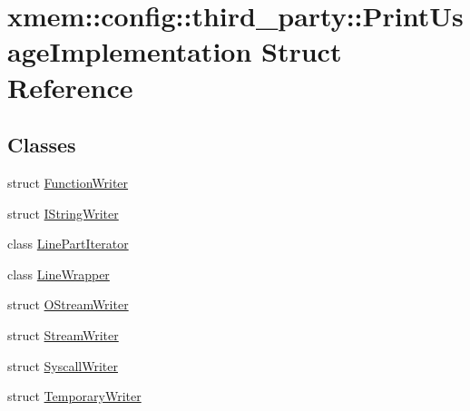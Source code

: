 \hypertarget{structxmem_1_1config_1_1third__party_1_1_print_usage_implementation}{\section{xmem\-:\-:config\-:\-:third\-\_\-party\-:\-:Print\-Usage\-Implementation Struct Reference}
\label{structxmem_1_1config_1_1third__party_1_1_print_usage_implementation}
}
\subsection*{Classes}
\begin{DoxyCompactItemize}
\item 
struct \hyperlink{structxmem_1_1config_1_1third__party_1_1_print_usage_implementation_1_1_function_writer}{Function\-Writer}
\item 
struct \hyperlink{structxmem_1_1config_1_1third__party_1_1_print_usage_implementation_1_1_i_string_writer}{I\-String\-Writer}
\item 
class \hyperlink{classxmem_1_1config_1_1third__party_1_1_print_usage_implementation_1_1_line_part_iterator}{Line\-Part\-Iterator}
\item 
class \hyperlink{classxmem_1_1config_1_1third__party_1_1_print_usage_implementation_1_1_line_wrapper}{Line\-Wrapper}
\item 
struct \hyperlink{structxmem_1_1config_1_1third__party_1_1_print_usage_implementation_1_1_o_stream_writer}{O\-Stream\-Writer}
\item 
struct \hyperlink{structxmem_1_1config_1_1third__party_1_1_print_usage_implementation_1_1_stream_writer}{Stream\-Writer}
\item 
struct \hyperlink{structxmem_1_1config_1_1third__party_1_1_print_usage_implementation_1_1_syscall_writer}{Syscall\-Writer}
\item 
struct \hyperlink{structxmem_1_1config_1_1third__party_1_1_print_usage_implementation_1_1_temporary_writer}{Temporary\-Writer}
\end{DoxyCompactItemize}
